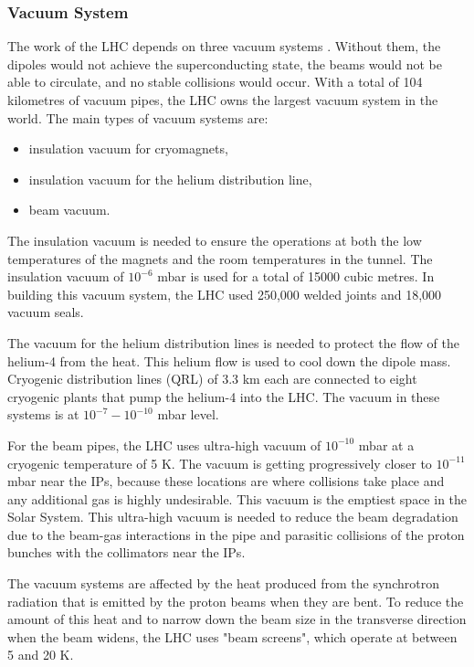 \begin{normalsize}


\subsubsection{Vacuum System}\label{sec:vacuum}




The work of the LHC depends on three vacuum systems \cite{LHC_vacuum}. Without them, the dipoles would not achieve the superconducting state, the beams would not be able to circulate, and no stable collisions would occur. With a total of 104 kilometres of vacuum pipes, the LHC owns the largest vacuum system in the world. The main types of vacuum systems are:

\begin{itemize}
\item insulation vacuum for cryomagnets,
\item insulation vacuum for the helium distribution line,
\item beam vacuum.
\end{itemize}


The insulation vacuum is needed to ensure the operations at both the low temperatures of the magnets and the room temperatures in the tunnel. The insulation vacuum of $10^{-6}$ mbar is used for a total of 15000 cubic metres. In building this vacuum system, the LHC used 250,000 welded joints and 18,000 vacuum seals. 


The vacuum for the helium distribution lines is needed to protect the flow of the helium-4 from the heat. This helium flow is used to cool down the dipole mass. Cryogenic distribution lines (QRL) of 3.3 km each are connected to eight cryogenic plants that pump the helium-4 into the LHC. The vacuum in these systems is at $10^{-7}-10^{-10}$ mbar level. 



For the beam pipes, the LHC uses ultra-high vacuum of $10^{-10}$ mbar at a cryogenic temperature of 5 K. The vacuum is getting progressively closer to $10^{-11}$ mbar near the IPs, because these locations are where collisions take place and any additional gas is highly undesirable. This vacuum is the emptiest space in the Solar System. This ultra-high vacuum is needed to reduce the beam degradation due to the beam-gas interactions in the pipe and parasitic collisions of the proton bunches with the collimators near the IPs. 

The vacuum systems are affected by the heat produced from the synchrotron radiation that is emitted by the proton beams when they are bent. To reduce the amount of this heat and to narrow down the beam size in the transverse direction when the beam widens, the LHC uses "beam screens", which operate at between 5 and 20 K. 



\end{normalsize}
